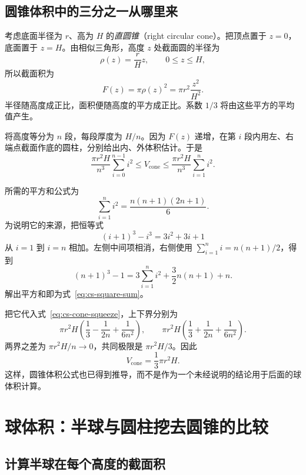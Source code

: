 \documentclass[UTF8,12pt,a4paper,fontset=fandol]{ctexart}
\begin{document}
\subsection{圆锥体积中的三分之一从哪里来}

考虑底面半径为 $r$、高为 $H$ 的\emph{直圆锥}（right circular cone）。把顶点置于 $z=0$，底面置于 $z=H$。由相似三角形，高度 $z$ 处截面圆的半径为
\[
  \rho(z)=\frac rH z,\qquad 0\leq z\leq H,
\]
所以截面积为
\begin{equation}\label{eq:cs-cone-section}
  F(z)=\pi\rho(z)^2=\pi r^2\frac{z^2}{H^2}.
\end{equation}
半径随高度成正比，面积便随高度的平方成正比。系数 $1/3$ 将由这些平方的平均值产生。

将高度等分为 $n$ 段，每段厚度为 $H/n$。因为 $F(z)$ 递增，在第 $i$ 段内用左、右端点截面作底的圆柱，分别给出内、外体积估计。于是
\begin{equation}\label{eq:cs-cone-squeeze}
  \frac{\pi r^2H}{n^3}\sum_{i=0}^{n-1}i^2
  \leq V_{\mathrm{cone}}
  \leq\frac{\pi r^2H}{n^3}\sum_{i=1}^{n}i^2.
\end{equation}

所需的平方和公式为
\begin{equation}\label{eq:cs-square-sum}
  \sum_{i=1}^{n}i^2=\frac{n(n+1)(2n+1)}6.
\end{equation}
为说明它的来源，把恒等式
\[
  (i+1)^3-i^3=3i^2+3i+1
\]
从 $i=1$ 到 $i=n$ 相加。左侧中间项相消，右侧使用 $\sum_{i=1}^n i=n(n+1)/2$，得到
\[
  (n+1)^3-1=3\sum_{i=1}^{n}i^2+\frac32n(n+1)+n.
\]
解出平方和即为式~\eqref{eq:cs-square-sum}。

把它代入式~\eqref{eq:cs-cone-squeeze}，上下界分别为
\[
  \pi r^2H\left(\frac13-\frac1{2n}+\frac1{6n^2}\right),
  \qquad
  \pi r^2H\left(\frac13+\frac1{2n}+\frac1{6n^2}\right).
\]
两界之差为 $\pi r^2H/n\to0$，共同极限是 $\pi r^2H/3$。因此
\begin{equation}\label{eq:cs-cone-volume}
  \boxed{V_{\mathrm{cone}}=\frac13\pi r^2H}.
\end{equation}
这样，圆锥体积公式也已得到推导，而不是作为一个未经说明的结论用于后面的球体积计算。

\section{球体积：半球与圆柱挖去圆锥的比较}
\label{sec:cs-sphere-volume}

\subsection{计算半球在每个高度的截面积}
\end{document}
